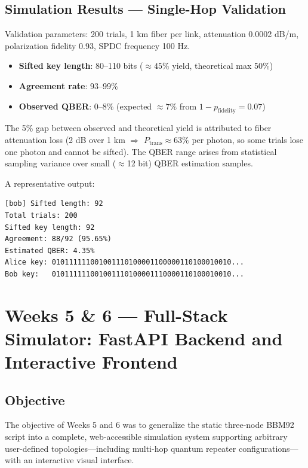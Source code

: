 \documentclass[12pt,oneside,letterpaper,english]{article}
\begin{document}
\subsection{Simulation Results --- Single-Hop Validation}

Validation parameters: 200 trials, 1 km fiber per link, attenuation 0.0002 dB/m, polarization fidelity 0.93, SPDC frequency 100 Hz.

\begin{itemize}
    \item \textbf{Sifted key length}: 80--110 bits ($\approx 45\%$ yield, theoretical max 50\%)
    \item \textbf{Agreement rate}: 93--99\%
    \item \textbf{Observed QBER}: 0--8\% (expected $\approx 7\%$ from $1 - p_{\text{fidelity}} = 0.07$)
\end{itemize}

The 5\% gap between observed and theoretical yield is attributed to fiber attenuation loss (2 dB over 1 km $\Rightarrow$ $P_{\text{trans}} \approx 63\%$ per photon, so some trials lose one photon and cannot be sifted). The QBER range arises from statistical sampling variance over small ($\approx$12 bit) QBER estimation samples.

A representative output:
\begin{lstlisting}[caption={Sample output: 200-trial BBM92 run}]
[bob] Sifted length: 92
Total trials: 200
Sifted key length: 92
Agreement: 88/92 (95.65%)
Estimated QBER: 4.35%
Alice key: 010111111001001110100001100000110100010010...
Bob key:   010111111001001110100001110000110100010010...
\end{lstlisting}

\section{Weeks 5 \& 6 --- Full-Stack Simulator: FastAPI Backend and Interactive Frontend}

\subsection{Objective}

The objective of Weeks 5 and 6 was to generalize the static three-node BBM92 script into a complete, web-accessible simulation system supporting arbitrary user-defined topologies—including multi-hop quantum repeater configurations—with an interactive visual interface.
\end{document}
